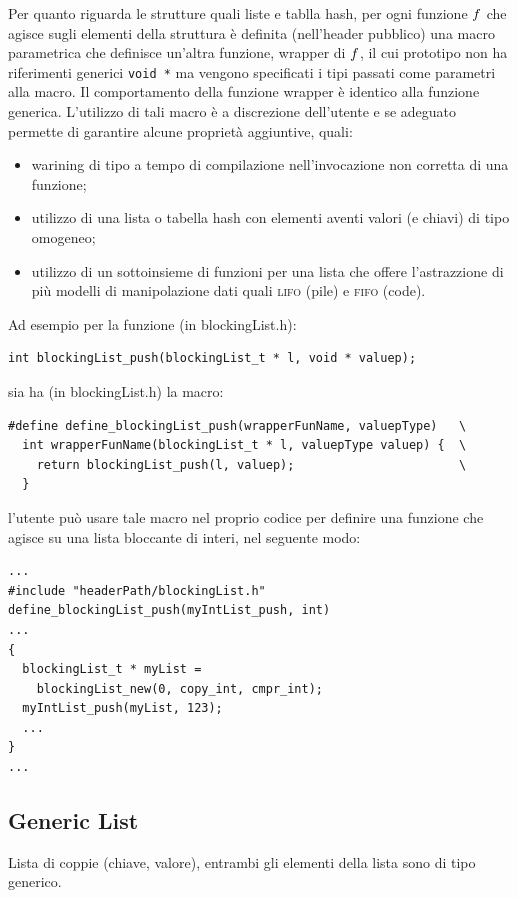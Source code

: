 \documentclass[a4paper,10pt]{article}
\begin{document}
Per quanto riguarda le strutture quali liste e tablla hash, per ogni
funzione $\mathnormal{f}$ che agisce sugli elementi della struttura
\`e definita (nell'header pubblico) una macro parametrica che
definisce un'altra funzione, wrapper di $\mathnormal{f}$, il cui
prototipo non ha riferimenti generici \texttt{void *} ma vengono
specificati i tipi passati come parametri alla macro. Il comportamento
della funzione wrapper \`e identico alla funzione generica. L'utilizzo
di tali macro \`e a discrezione dell'utente e se adeguato permette di
garantire alcune propriet\`a aggiuntive, quali:
\begin{itemize}
  \item warining di tipo a tempo di compilazione nell'invocazione non
    corretta di una funzione;
  \item utilizzo di una lista o tabella hash con elementi aventi
    valori (e chiavi) di tipo omogeneo;
  \item utilizzo di un sottoinsieme di funzioni per una lista che
    offere l'astrazzione di pi\`u modelli di manipolazione dati quali
    \textsc{lifo} (pile) e \textsc{fifo} (code).
\end{itemize}
Ad esempio per la funzione (in blockingList.h):
\begin{verbatim}
int blockingList_push(blockingList_t * l, void * valuep);
\end{verbatim}
sia ha (in blockingList.h) la macro:
\begin{verbatim}
#define define_blockingList_push(wrapperFunName, valuepType)   \ 
  int wrapperFunName(blockingList_t * l, valuepType valuep) {  \
    return blockingList_push(l, valuep);                       \
  }
\end{verbatim}
l'utente pu\`o usare tale macro nel proprio codice per definire una
funzione che agisce su una lista bloccante di interi, nel seguente
modo:
\begin{verbatim} 
...
#include "headerPath/blockingList.h"
define_blockingList_push(myIntList_push, int)
...
{
  blockingList_t * myList = 
    blockingList_new(0, copy_int, cmpr_int);
  myIntList_push(myList, 123);
  ...
}
...
\end{verbatim}

\subsection{Generic List}
Lista di coppie (chiave, valore), entrambi gli elementi della lista
sono di tipo generico. 
\end{document}

